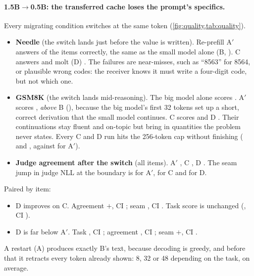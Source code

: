 \paragraph{1.5B$\to$0.5B: the transferred cache loses the prompt's specifics.}
Every migrating condition switches at the same token (\cref{fig:quality,tab:quality}).
\begin{itemize}
\item \textbf{Needle} (the switch lands just before the value is written). Re-prefill A$'$ answers  of the items correctly, the same as the small model alone (B, ). C answers  and molt (D) . The failures are near-misses, such as ``8563'' for 8564, or plausible wrong codes: the receiver knows it must write a four-digit code, but not which one.
\item \textbf{GSM8K} (the switch lands mid-reasoning). The big model alone scores . A$'$ scores , \emph{above} B (), because the big model's first 32 tokens set up a short, correct derivation that the small model continues. C scores  and D . Their continuations stay fluent and on-topic but bring in quantities the problem never states. Every C and D run hits the 256-token cap without finishing ( and , against  for A$'$).
\item \textbf{Judge agreement after the switch} (all  items). A$'$ , C , D . The seam jump in judge NLL at the boundary is  for A$'$,  for C and  for D.
\end{itemize}
Paired by item:
\begin{itemize}
\item D improves on C. Agreement $+$, CI ; seam , CI . Task score is unchanged (, CI ).
\item D is far below A$'$. Task , CI ; agreement , CI ; seam $+$, CI .
\end{itemize}
A restart (A) produces exactly B's text, because decoding is greedy, and before that it retracts every token already shown: 8, 32 or 48 depending on the task,  on average.

